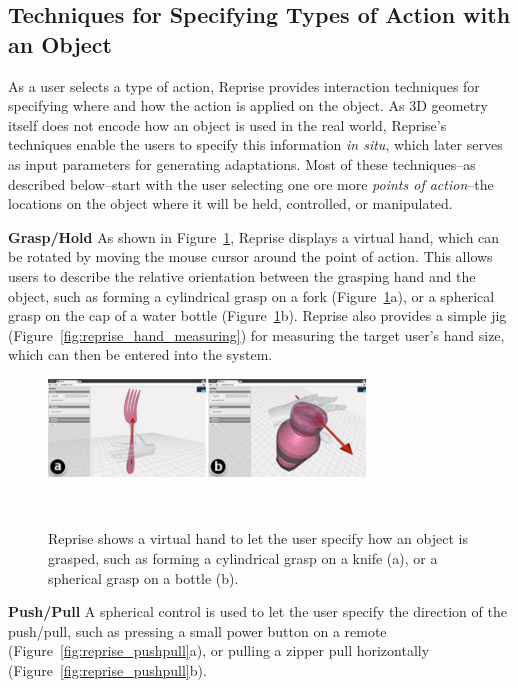 \subsection{Techniques for Specifying Types of Action with an Object}
As a user selects a type of action, Reprise provides interaction techniques for specifying where and how the action is applied on the object. As 3D geometry itself does not encode how an object is used in the real world, Reprise's techniques enable the users to specify this information \textit{in situ}, which later serves as input parameters for generating adaptations. Most of these techniques--as described below--start with the user selecting one ore more \textit{points of action}--the locations on the object where it will be held, controlled, or manipulated.

\textbf{Grasp/Hold} As shown in Figure~\ref{fig:reprise_grasp}, Reprise displays a virtual hand, which can be rotated by moving the mouse cursor around the point of action. This allows users to describe the relative orientation between the grasping hand and the object, such as forming a cylindrical grasp \cite{9780323033848} on a fork (Figure~\ref{fig:reprise_grasp}a), or a spherical grasp \cite{9780323033848} on the cap of a water bottle (Figure~\ref{fig:reprise_grasp}b). Reprise also provides a simple jig (Figure~\ref{fig:reprise_hand_measuring}) for measuring the target user's hand size, which can then be entered into the system.

\begin{figure}[h!]
  \centering
  \includegraphics[width=0.75\textwidth]{figures/reprise_grasp_v1.pdf}
\caption{Reprise shows a virtual hand to let the user specify how an object is grasped, such as forming a cylindrical grasp on a knife (a), or a spherical grasp on a bottle (b).}~\label{fig:reprise_grasp}
\end{figure}

\textbf{Push/Pull} A spherical control is used to let the user specify the direction of the push/pull, such as pressing a small power button on a remote (Figure~\ref{fig:reprise_pushpull}a), or pulling a zipper pull horizontally (Figure~\ref{fig:reprise_pushpull}b).

